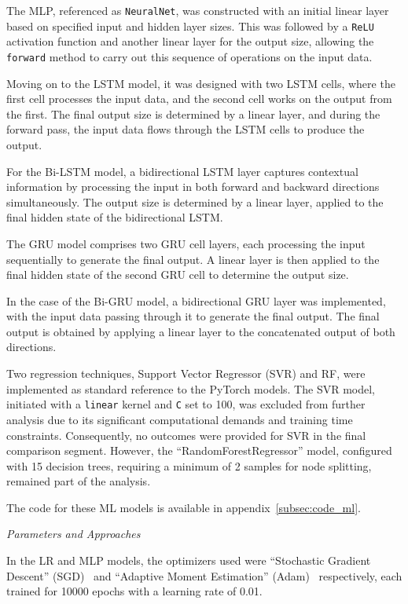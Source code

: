The MLP, referenced as \texttt{NeuralNet}, was constructed with an initial linear layer based on specified input and hidden layer sizes.
This was followed by a \texttt{ReLU} activation function and another linear layer for the output size, allowing the \texttt{forward} method to carry out this sequence of operations on the input data.

Moving on to the LSTM model, it was designed with two LSTM cells, where the first cell processes the input data, and the second cell works on the output from the first.
The final output size is determined by a linear layer, and during the forward pass, the input data flows through the LSTM cells to produce the output.

For the Bi-LSTM model, a bidirectional LSTM layer captures contextual information by processing the input in both forward and backward directions simultaneously.
The output size is determined by a linear layer, applied to the final hidden state of the bidirectional LSTM\@.

The GRU model comprises two GRU cell layers, each processing the input sequentially to generate the final output.
A linear layer is then applied to the final hidden state of the second GRU cell to determine the output size.

In the case of the Bi-GRU model, a bidirectional GRU layer was implemented, with the input data passing through it to generate the final output.
The final output is obtained by applying a linear layer to the concatenated output of both directions.

Two regression techniques, Support Vector Regressor (SVR) and RF, were implemented as standard reference to the PyTorch models.
The SVR model, initiated with a \texttt{linear} kernel and \texttt{C} set to 100, was excluded from further analysis due to its significant computational demands and training time constraints.
Consequently, no outcomes were provided for SVR in the final comparison segment.
However, the \enquote{RandomForestRegressor} model, configured with 15 decision trees, requiring a minimum of 2 samples for node splitting, remained part of the analysis.

The code for these ML models is available in appendix~\ref{subsec:code_ml}.

\vspace{0.2cm}
\textit{Parameters and Approaches}
\vspace{0.2cm}

In the LR and MLP models, the optimizers used were \enquote{Stochastic Gradient Descent} (SGD)~\cite{SGDPyTorchDocumentation} and \enquote{Adaptive Moment Estimation} (Adam)~\cite{AdamPyTorchDocumentationa} respectively,
each trained for 10000 epochs with a learning rate of 0.01.

